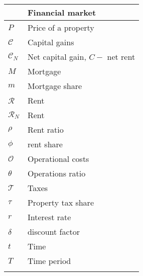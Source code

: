 \begin{longtable}{lp{10cm}}
\hline           & \textbf{Financial market}          \\ \hline
$P$              &  Price of a property               \\ 
$\mathcal{C}$    &  Capital gains                     \\ %
$\mathcal{C}_N$  &  Net capital gain, $C -$ net rent  \\
$M$              &  Mortgage                          \\ 
$m$              &  Mortgage share                    \\ 
$\mathcal{R}$    &  Rent                              \\
$\mathcal{R}_N$  &  Rent                              \\
$\rho$           &  Rent ratio                        \\
$\phi$           &  \Gls{rent share}                  \\
$\mathcal{O}$    &  Operational costs                 \\
$\theta$         &  Operations ratio                  \\ %
$\mathcal{T}$    &  Taxes                             \\ %
$\tau$           &  Property tax share                \\ %
$r$              &  Interest rate                     \\
$\delta$         &  \Gls{discount factor}             \\
$t$              &  Time                              \\
$T$              &  Time period                       \\
\hline
\color{black}
\end{longtable}  



\newpage

